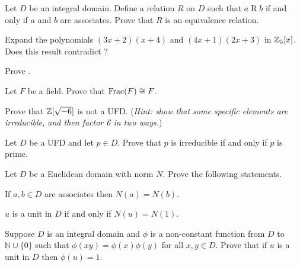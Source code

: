 \begin{problem}
    Let $D$ be an integral domain. Define a relation $R$ on $D$ such that $a\mathrel{R}b$ if and only if $a$ and $b$ are associates. Prove that $R$ is an equivalence relation.
\end{problem}

\begin{problem}
    Expand the polynomials $(3x+2)(x+4)$ and $(4x+1)(2x+3)$ in $\mathbb{Z}_5[x]$. Does this result contradict ?
\end{problem}

\begin{problem}\label{problem-prime-element-iff-generates-prime-ideal}
    Prove .
\end{problem}

\begin{problem}
    Let $F$ be a field. Prove that $\mathrm{Frac}(F) \cong F$.
\end{problem}

\begin{problem}
    Prove that $\mathbb{Z}[\sqrt{-6}]$ is not a UFD.\newline
    (\textit{Hint: show that some specific elements are irreducible, and then factor 6 in two ways.})
\end{problem}

\begin{problem}
    Let $D$ be a UFD and let $p \in D$. Prove that $p$ is irreducible if and only if $p$ is prime.
\end{problem}

\begin{problem}
    Let $D$ be a Euclidean domain with norm $N$. Prove the following statements.
    \begin{partquestions}{\alph*}
        \item If $a, b \in D$ are associates then $N(a) = N(b)$.
        \item $u$ is a unit in $D$ if and only if $N(u) = N(1)$.
    \end{partquestions}
\end{problem}

\begin{problem}
    Suppose $D$ is an integral domain and $\phi$ is a non-constant function from $D$ to $\mathbb{N} \cup \{0\}$ such that $\phi(xy) = \phi(x)\phi(y)$ for all $x,y\in D$. Prove that if $u$ is a unit in $D$ then $\phi(u) = 1$.
\end{problem}

